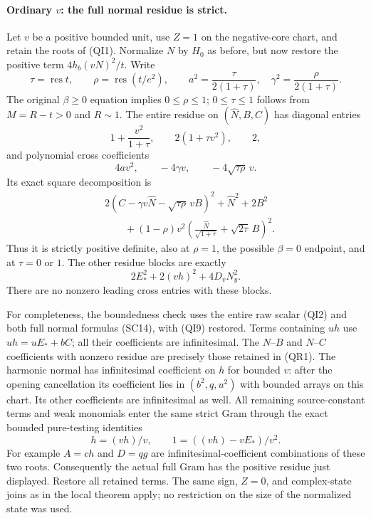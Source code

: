 \paragraph{Ordinary $v$: the full normal residue is strict.}
Let $v$ be a positive bounded unit, use $Z=1$ on the negative-core
chart, and retain the roots of (QI1). Normalize $N$ by $H_0$ as
before, but now restore the positive term $4h_b(vN)^2/t$.
Write
\[
 \tau=\operatorname{res}t,\qquad
 \rho=\operatorname{res}(t/e^2),\qquad
 a^2=\frac{\tau}{2(1+\tau)},\quad
 \gamma^2=\frac{\rho}{2(1+\tau)}.
\]
The original $\beta\ge0$ equation implies $0\le\rho\le1$;
$0\le\tau\le1$ follows from $M=R-t>0$ and $R\sim1$.
The entire residue on $(\widehat N,B,C)$ has diagonal entries
\[
 1+\frac{v^2}{1+\tau},\qquad 2(1+\tau v^2),\qquad 2,
\]
and polynomial cross coefficients
\[
 4av^2,\qquad -4\gamma v,\qquad -4\sqrt{\tau\rho}\,v.
\]
Its exact square decomposition is
\begin{align*}
 &2(C-\gamma v\widehat N-\sqrt{\tau\rho}\,vB)^2
       +\widehat N^2+2B^2\\
 &\qquad +(1-\rho)v^2
    \left(\frac{\widehat N}{\sqrt{1+\tau}}+
                         \sqrt{2\tau}\,B\right)^2.
 \tag{QR1}
\end{align*}
Thus it is strictly positive definite, also at $\rho=1$, the
possible $\beta=0$ endpoint, and at $\tau=0$ or $1$.
The other residue blocks are exactly
\[
                       2E_*^2+2(vh)^2+4D_vN_y^2.
\]
There are no nonzero leading cross entries with these blocks.

For completeness, the boundedness check uses the entire raw scalar
(QI2) and both full normal formulas (SC14), with (QI9) restored.
Terms containing $u h$ use $u h=uE_*+bC$; all their coefficients
are infinitesimal. The $N$--$B$ and $N$--$C$ coefficients with
nonzero residue are precisely those retained in (QR1). The harmonic
normal has infinitesimal coefficient on $h$ for bounded $v$:
after the opening cancellation its coefficient lies in
$(b^2,q,u^2)$ with bounded arrays on this chart. Its other
coefficients are infinitesimal as well.
All remaining source-constant terms and weak monomials enter the
same strict Gram through the exact bounded pure-testing identities
\[
                   h=(vh)/v,\qquad
                   1=((vh)-vE_*)/v^2.
\]
For example $A=ch$ and $D=qg$ are infinitesimal-coefficient
combinations of these two roots. Consequently the actual full Gram
has the positive residue just displayed. Restore all retained
terms. The same sign, $Z=0$, and complex-state joins as in the
local theorem apply; no restriction on the size of the normalized
state was used.

